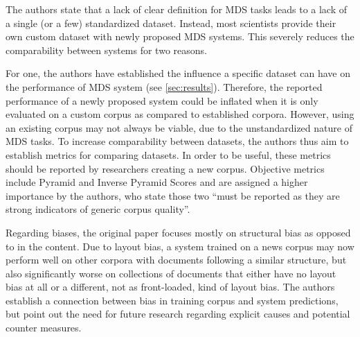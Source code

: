 \documentclass[20_original-paper.tex]{subfiles}
\begin{document}
The authors state that a lack of clear definition for MDS tasks leads to a lack of a single (or a few) standardized dataset.
Instead, most scientists provide their own custom dataset with newly proposed MDS systems.
This severely reduces the comparability between systems for two reasons.

For one, the authors have established the influence a specific dataset can have on the performance of MDS system (see \ref{sec:results}).
Therefore, the reported performance of a newly proposed system could be inflated when it is only evaluated on a custom corpus as compared to established corpora.
However, using an existing corpus may not always be viable, due to the unstandardized nature of MDS tasks.
To increase comparability between datasets, the authors thus aim to establish metrics for comparing datasets.
In order to be useful, these metrics should be reported by researchers creating a new corpus.
Objective metrics include Pyramid and Inverse Pyramid Scores and are assigned a higher importance by the authors, who state those two \enquote{must be
    reported as they are strong indicators of generic corpus quality}\cite{dey-etal-2020-corpora}.


Regarding biases, the original paper focuses mostly on structural bias as opposed to in the content.
Due to layout bias, a system trained on a news corpus may now perform well on other corpora with documents following a similar structure, but also significantly worse on collections of documents that either have no layout bias at all or a different, not as front-loaded, kind of layout bias.\cite{leverage-lead-bias-https://doi.org/10.48550/arxiv.1912.11602}
The authors establish a connection between bias in training corpus and system predictions, but point out the need for future research regarding explicit causes and potential counter measures.
\end{document}
